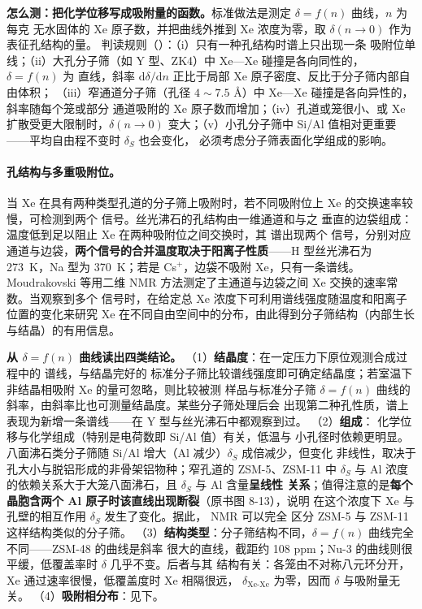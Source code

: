 \begin{measure}
\textbf{怎么测：把化学位移写成吸附量的函数。}标准做法是测定 $\delta=f(n)$ 曲线，$n$ 为每克
无水固体的 Xe 原子数，并把曲线外推到 Xe 浓度为零，取 $\delta(n\to0)$ 作为表征孔结构的量。
判读规则（）：（i）只有一种孔结构时谱上只出现一条
吸附位单线；（ii）大孔分子筛（如 Y 型、ZK4）中 Xe—Xe 碰撞是各向同性的，$\delta=f(n)$ 为
直线，斜率 $\mathrm{d}\delta/\mathrm{d}n$ 正比于局部 Xe 原子密度、反比于分子筛内部自由体积；
（iii）窄通道分子筛（孔径 $4\sim7.5$ \AA{}）中 Xe—Xe 碰撞是各向异性的，斜率随每个笼或部分
通道吸附的 Xe 原子数而增加；（iv）孔道或笼很小、或 Xe 扩散受更大限制时，$\delta(n\to0)$
变大；（v）小孔分子筛中 Si/Al 值相对更重要——平均自由程不变时 $\delta_{S}$ 也会变化，
必须考虑分子筛表面化学组成的影响。
\end{measure}

\paragraph{孔结构与多重吸附位。}当 Xe 在具有两种类型孔道的分子筛上吸附时，若不同吸附位上
Xe 的交换速率较慢，可检测到两个  信号。丝光沸石的孔结构由一维通道和与之
垂直的边袋组成：温度低到足以阻止 Xe 在两种吸附位之间交换时，其  谱出现两个
信号，分别对应通道与边袋，\textbf{两个信号的合并温度取决于阳离子性质}——H 型丝光沸石为
\qty{273}{K}，Na 型为 \qty{370}{K}；若是 Cs$^{+}$，边袋不吸附 Xe，只有一条谱线。
Moudrakovski 等用二维 NMR 方法测定了主通道与边袋之间 Xe 交换的速率常数。当观察到多个
 信号时，在给定总 Xe 浓度下可利用谱线强度随温度和阳离子位置的变化来研究
Xe 在不同自由空间中的分布，由此得到分子筛结构（内部生长与结晶）的有用信息。

\begin{dataflow}
\textbf{从 $\delta=f(n)$ 曲线读出四类结论。}
（1）\textbf{结晶度}：在一定压力下原位观测合成过程中的  谱线，与结晶完好的
标准分子筛比较谱线强度即可确定结晶度；若室温下非结晶相吸附 Xe 的量可忽略，则比较被测
样品与标准分子筛 $\delta=f(n)$ 曲线的斜率，由斜率比也可测量结晶度。某些分子筛处理后会
出现第二种孔性质，谱上表现为新增一条谱线——在 Y 型与丝光沸石中都观察到过。
（2）\textbf{组成}： 化学位移与化学组成（特别是电荷数即 Si/Al 值）有关，低温与
小孔径时依赖更明显。八面沸石类分子筛随 Si/Al 增大（Al 减少）$\delta_{S}$ 成倍减少，但变化
非线性，取决于孔大小与脱铝形成的非骨架铝物种；窄孔道的 ZSM-5、ZSM-11 中
$\delta_{S}$ 与 Al 浓度的依赖关系大于大笼八面沸石，且 $\delta_{S}$ 与 Al 含量\textbf{呈线性
关系}；值得注意的是\textbf{每个晶胞含两个 Al 原子时该直线出现断裂}（原书图 8-13），说明
在这个浓度下 Xe 与孔壁的相互作用 $\delta_{S}$ 发生了变化。据此， NMR 可以完全
区分 ZSM-5 与 ZSM-11 这样结构类似的分子筛。
（3）\textbf{结构类型}：分子筛结构不同，$\delta=f(n)$ 曲线完全不同——ZSM-48 的曲线是斜率
很大的直线，截距约 108 ppm；Nu-3 的曲线则很平缓，低覆盖率时 $\delta$ 几乎不变。后者与其
结构有关：各笼由不对称八元环分开，Xe 通过速率很慢，低覆盖度时 Xe 相隔很远，
$\delta_{\mathrm{Xe\text{-}Xe}}$ 为零，因而 $\delta$ 与吸附量无关。
（4）\textbf{吸附相分布}：见下。
\end{dataflow}

